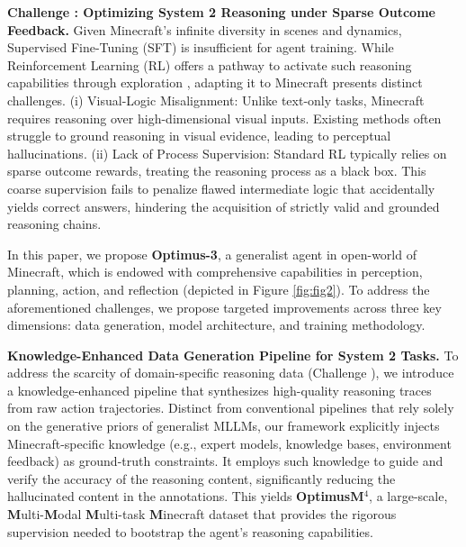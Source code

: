 
\textbf{Challenge \uppercase\expandafter{}: Optimizing System 2 Reasoning under Sparse Outcome Feedback.} Given Minecraft's infinite diversity in scenes and dynamics, Supervised Fine-Tuning (SFT) is insufficient for agent training. While Reinforcement Learning (RL) \cite{schulman2017ppo,rafailov2023dpo} offers a pathway to activate such reasoning capabilities through exploration \cite{guo2025deepseek,shao2024deepseekmath}, adapting it to Minecraft presents distinct challenges. (i) Visual-Logic Misalignment: Unlike text-only tasks, Minecraft requires reasoning over high-dimensional visual inputs. Existing methods \cite{schulman2017ppo,rafailov2023dpo,shao2024deepseekmath} often struggle to ground reasoning in visual evidence, leading to perceptual hallucinations. (ii) Lack of Process Supervision: Standard RL typically relies on sparse outcome rewards, treating the reasoning process as a black box. This coarse supervision fails to penalize flawed intermediate logic that accidentally yields correct answers, hindering the acquisition of strictly valid and grounded reasoning chains.



In this paper, we propose \textbf{Optimus-3}, a generalist agent in open-world of Minecraft, which is endowed with comprehensive capabilities in perception, planning, action, and reflection (depicted in Figure \ref{fig:fig2}). To address the aforementioned challenges, we propose targeted improvements across three key dimensions: data generation, model architecture, and training methodology. 


\textbf{Knowledge-Enhanced Data Generation Pipeline for System 2 Tasks.} To address the scarcity of domain-specific reasoning data (Challenge \uppercase\expandafter{}), we introduce a knowledge-enhanced pipeline that synthesizes high-quality  reasoning traces from raw action trajectories. Distinct from conventional pipelines that rely solely on the generative priors of generalist MLLMs, our framework explicitly injects Minecraft-specific knowledge (e.g., expert models, knowledge bases, environment feedback) as ground-truth constraints. It employs such knowledge to guide and verify the accuracy of the reasoning content, significantly reducing the hallucinated content in the annotations. This yields \textbf{OptimusM$^4$}, a large-scale, \textbf{M}ulti-\textbf{M}odal \textbf{M}ulti-task \textbf{M}inecraft dataset that provides the rigorous supervision needed to bootstrap the agent's reasoning capabilities.



